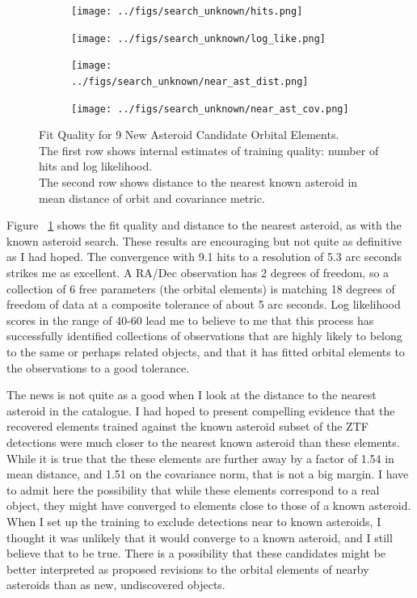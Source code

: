 \begin{figure}[h]
\begin{subfigure}[t]{\subfigwidth\textwidth}
\centering
\texttt{[image: ../figs/search\_unknown/hits.png]}
\end{subfigure}
\hfill
\begin{subfigure}[t]{\subfigwidth\textwidth}
\centering
\texttt{[image: ../figs/search\_unknown/log\_like.png]}
\end{subfigure}
\medskip
\begin{subfigure}[t]{\subfigwidth\textwidth}
\centering
\texttt{[image: ../figs/search\_unknown/near\_ast\_dist.png]}
\end{subfigure}
\hfill
\begin{subfigure}[t]{\subfigwidth\textwidth}
\centering
\texttt{[image: ../figs/search\_unknown/near\_ast\_cov.png]}
\end{subfigure}
\caption[Fit Quality for 9 New Asteroid Candidate Orbital Elements]
{Fit Quality for 9 New Asteroid Candidate Orbital Elements.\\
The first row shows internal estimates of training quality: number of hits and log likelihood.\\
The second row shows distance to the nearest known asteroid in mean distance of orbit and covariance metric.}
\label{fig:TrainUnknown}
\end{figure}

Figure ~\ref{fig:TrainUnknown} shows the fit quality and distance to the nearest asteroid, as with the known asteroid search.
These results are encouraging but not quite as definitive as I had hoped.
The convergence with 9.1 hits to a resolution of 5.3 arc seconds strikes me as excellent.
A RA/Dec observation has 2 degrees of freedom, so a collection of 6 free parameters (the orbital elements)
is matching 18 degrees of freedom of data at a composite tolerance of about 5 arc seconds.
Log likelihood scores in the range of 40-60 lead me to believe to me that this process 
has successfully identified collections of observations that are highly likely to belong to the same or perhaps related objects,
and that it has fitted orbital elements to the observations to a good tolerance.

The news is not quite as a good when I look at the distance to the nearest asteroid in the catalogue.
I had hoped to present compelling evidence that the recovered elements trained against the
known asteroid subset of the ZTF detections were much closer to the nearest known asteroid than these elements.
While it is true that the these elements are further away by a factor of 1.54 in mean distance,
and 1.51 on the covariance norm, that is not a big margin.
I have to admit here the possibility that while these elements correspond to a real object,
they might have converged to elements close to those of a known asteroid.
When I set up the training to exclude detections near to known asteroids,
I thought it was unlikely that it would converge to a known asteroid, and I still believe that to be true.
There is a possibility that these candidates might be better interpreted as proposed revisions to the
orbital elements of nearby asteroids than as new, undiscovered objects.

